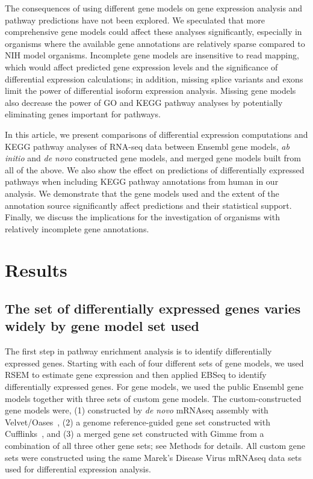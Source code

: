 The consequences of using different gene models on gene
expression analysis and pathway predictions have not been
explored.  We speculated that more comprehensive gene models
could affect these analyses significantly, especially in
organisms where the available gene annotations are
relatively sparse compared to NIH model organisms.
Incomplete gene models are insensitive to read mapping,
which would affect predicted gene expression levels and the
significance of differential expression calculations; in
addition, missing splice variants and exons limit the power
of differential isoform expression analysis.  Missing gene
models also decrease the power of GO and KEGG pathway
analyses by potentially eliminating genes important for
pathways.

In this article, we present comparisons of differential
expression computations and KEGG pathway analyses of RNA-seq
data between Ensembl gene models, {\em ab initio} and {\em
de novo} constructed gene models, and merged gene models
built from all of the above.  We also show the effect on
predictions of differentially expressed pathways when
including KEGG pathway annotations from human in our
analysis.  We demonstrate that the gene models used and the
extent of the annotation source significantly affect
predictions and their statistical support.  Finally, we
discuss the implications for the investigation of organisms
with relatively incomplete gene annotations.

\section{Results}

\subsection{The set of differentially expressed genes varies widely
by gene model set used}


The first step in pathway enrichment analysis is to identify
differentially expressed genes.  Starting with each of four
different sets of gene models, we used RSEM to estimate gene
expression and then applied EBSeq to identify differentially
expressed genes.  For gene models, we used the public
Ensembl gene models together with three sets of custom gene
models.  The custom-constructed gene models were, (1)
constructed by {\em de novo} mRNAseq assembly with
Velvet/Oases~\cite{Zerbino:2008vu,Schulz:2012je}, (2) a
genome reference-guided gene set constructed with
Cufflinks~\cite{Trapnell:2010kd}, and (3) a merged gene set
constructed with Gimme from a combination of all three other
gene sets; see Methods for details.  All custom gene sets
were constructed using the same Marek's Disease Virus
mRNAseq data sets used for differential expression analysis.

